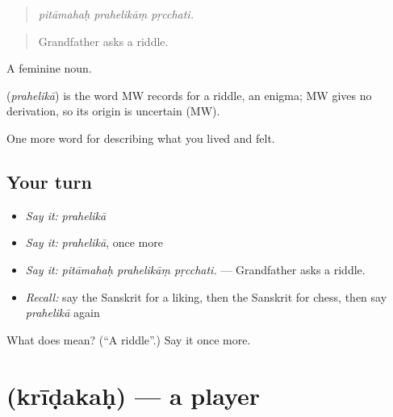 \begin{quote}
  
\end{quote}

\begin{quote}
\emph{pitāmahaḥ prahelikāṃ pṛcchati.}
\end{quote}

\begin{quote}
Grandfather asks a riddle.
\end{quote}

A feminine noun.

\begin{cousinweb}
\textbf{} (\emph{prahelikā}) is the word MW records for a riddle, an enigma; MW gives no derivation, so its origin is uncertain (MW).
\end{cousinweb}

\begin{grammarlens}[title={What you've built}]
One more word for describing what you lived and felt.
\end{grammarlens}

\subsection*{Your turn}
\begin{itemize}
\raggedright
  \item \emph{Say it:} \emph{prahelikā}
  \item \emph{Say it:} \emph{prahelikā}, once more
  \item \emph{Say it:} \emph{pitāmahaḥ prahelikāṃ pṛcchati.} — Grandfather asks a riddle.
  \item \emph{Recall:} say the Sanskrit for a liking, then the Sanskrit for chess, then say \emph{prahelikā} again
\end{itemize}

\begin{tcolorbox}[breakable,colback=teal!4,colframe=teal!35!black,title={Before you move on}]
What does  mean? (\textquotedblleft{}A riddle\textquotedblright{}.) Say it once more.
\end{tcolorbox}
\section[\texorpdfstring{\sk{क्रीडकः} (krīḍakaḥ)}{क्रीडकः (krīḍakaḥ)}]{ (krīḍakaḥ) — a player}

\label{lesson:SA-C517-kridakah}



